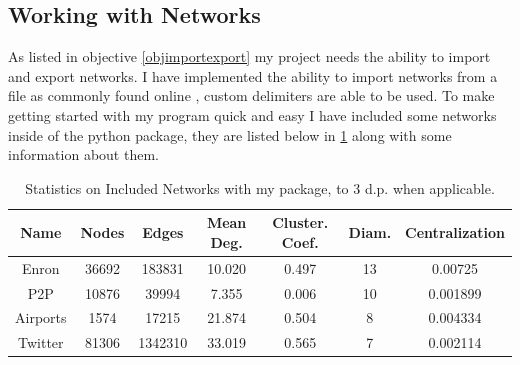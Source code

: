 \documentclass{article}
\begin{document}
\subsection{Working with Networks}

As listed in objective \ref{objimportexport} my project needs the ability to import and export networks.
I have implemented the ability to import networks from a file as commonly found online \cite{}, custom delimiters are able to be used.
To make getting started with my program quick and easy I have included some networks inside of the python package, they are listed below in \ref{includedNets} along with some information about them.

\begin{table}[h]
	\centering
	\begin{tabular}{|c|c|c|c|c|c|c|}
		\hline
		\textbf{Name} & \textbf{Nodes} & \textbf{Edges} & \textbf{Mean Deg.} & \textbf{Cluster. Coef.} & \textbf{Diam.} & \textbf{Centralization} \\
		\hline
		Enron         & 36692          & 183831         & 10.020             & 0.497                   & 13             & 0.00725                 \\
		\hline
		P2P           & 10876          & 39994          & 7.355              & 0.006                   & 10             & 0.001899                \\
		\hline
		Airports      & 1574           & 17215          & 21.874             & 0.504                   & 8              & 0.004334                \\
		\hline
		Twitter       & 81306          & 1342310        & 33.019             & 0.565                   & 7              & 0.002114                \\
		\hline
	\end{tabular}
	\caption{Statistics on Included Networks with my package, to 3 d.p. when applicable.}
	\label{includedNets}
\end{table}
\end{document}
